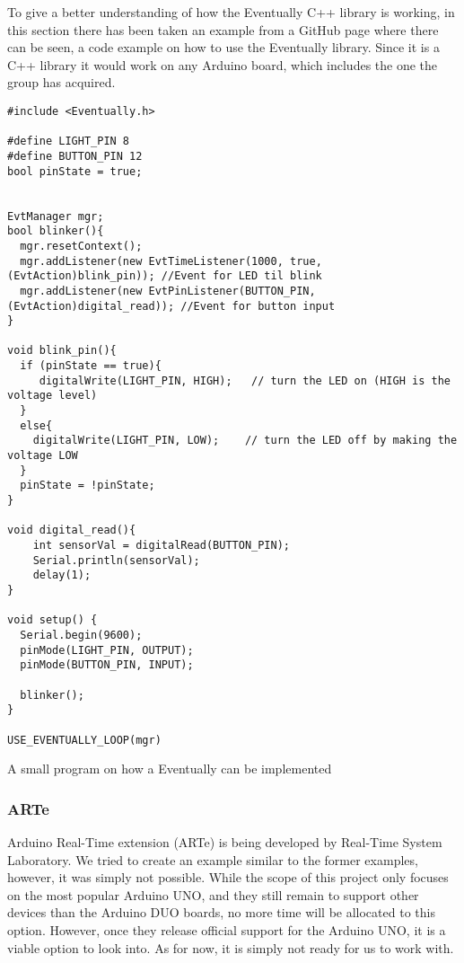 To give a better understanding of how the Eventually C++ library is working, in this section there has been taken an example from a GitHub page \cite{bartlettEventually2022Bartlett} where there can be seen, a code example on how to use the Eventually library. Since it is a C++ library it would work on any Arduino board, which includes the one the group has acquired.


\begin{listing}
\begin{verbatim}
#include <Eventually.h>

#define LIGHT_PIN 8
#define BUTTON_PIN 12
bool pinState = true;


EvtManager mgr;
bool blinker(){
  mgr.resetContext();
  mgr.addListener(new EvtTimeListener(1000, true, (EvtAction)blink_pin)); //Event for LED til blink
  mgr.addListener(new EvtPinListener(BUTTON_PIN, (EvtAction)digital_read)); //Event for button input
}

void blink_pin(){
  if (pinState == true){
     digitalWrite(LIGHT_PIN, HIGH);   // turn the LED on (HIGH is the voltage level)
  }
  else{
    digitalWrite(LIGHT_PIN, LOW);    // turn the LED off by making the voltage LOW
  }
  pinState = !pinState;
}

void digital_read(){
    int sensorVal = digitalRead(BUTTON_PIN);
    Serial.println(sensorVal);
    delay(1);
}

void setup() {
  Serial.begin(9600);
  pinMode(LIGHT_PIN, OUTPUT);
  pinMode(BUTTON_PIN, INPUT);
  
  blinker();
}

USE_EVENTUALLY_LOOP(mgr)
\end{verbatim}
\caption{A small program on how a Eventually can be implemented}
\label{List: Eventually example}
\end{listing}



\subsubsection{ARTe}

Arduino Real-Time extension (ARTe) is being developed by Real-Time System Laboratory. We tried to create an example similar to the former examples, however, it was simply not possible. While the scope of this project only focuses on the most popular Arduino UNO, and they still remain to support other devices than the Arduino DUO boards, no more time will be allocated to this option. However, once they release official support for the Arduino UNO, it is a viable option to look into. As for now, it is simply not ready for us to work with.



